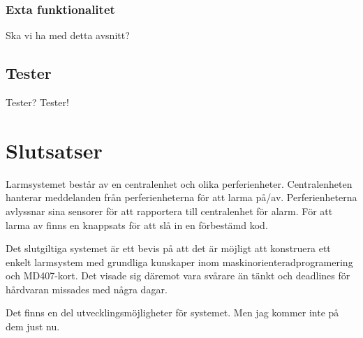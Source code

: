 \documentclass[a4paper]{article}
\begin{document}
\subsubsection{Exta funktionalitet}
Ska vi ha med detta avsnitt?

\subsection{Tester}
Tester? Tester!


\section{Slutsatser}
Larmsystemet består av en centralenhet och olika perferienheter. Centralenheten hanterar meddelanden från perferienheterna för att larma på/av. Perferienheterna avlyssnar sina sensorer för att rapportera till centralenhet för alarm. För att larma av finns en knappsats för att slå in en förbestämd kod.



Det slutgiltiga systemet är ett bevis på att det är möjligt att konstruera ett enkelt larmsystem med grundliga kunskaper inom maskinorienteradprogramering och MD407-kort. Det visade sig däremot vara svårare än tänkt och deadlines för hårdvaran missades med några dagar.

Det finns en del utvecklingsmöjligheter för systemet. Men jag kommer inte på dem just nu.




\end{document}
